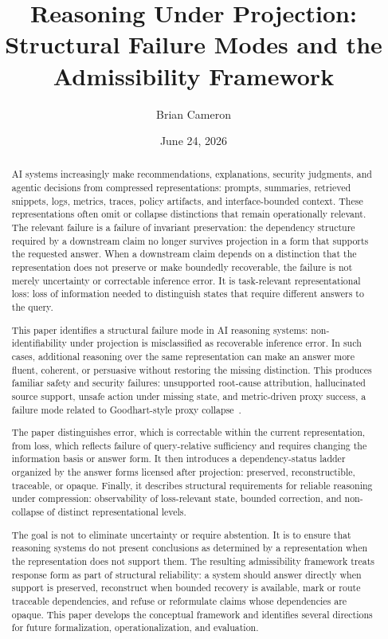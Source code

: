 \documentclass[11pt]{article}
\title{Reasoning Under Projection:\\
Structural Failure Modes and the Admissibility Framework}
\author{Brian Cameron}
\date{June 24, 2026}
\begin{document}
\maketitle

\begin{abstract}
AI systems increasingly make recommendations, explanations, security judgments, and agentic decisions from compressed representations: prompts, summaries, retrieved snippets, logs, metrics, traces, policy artifacts, and interface-bounded context. These representations often omit or collapse distinctions that remain operationally relevant. The relevant failure is a failure of invariant preservation: the dependency structure required by a downstream claim no longer survives projection in a form that supports the requested answer. When a downstream claim depends on a distinction that the representation does not preserve or make boundedly recoverable, the failure is not merely uncertainty or correctable inference error. It is task-relevant representational loss: loss of information needed to distinguish states that require different answers to the query.

This paper identifies a structural failure mode in AI reasoning systems: non-identifiability under projection is misclassified as recoverable inference error. In such cases, additional reasoning over the same representation can make an answer more fluent, coherent, or persuasive without restoring the missing distinction. This produces familiar safety and security failures: unsupported root-cause attribution, hallucinated source support, unsafe action under missing state, and metric-driven proxy success, a failure mode related to Goodhart-style proxy collapse~\cite{Goodhart1975}.

The paper distinguishes error, which is correctable within the current representation, from loss, which reflects failure of query-relative sufficiency and requires changing the information basis or answer form. It then introduces a dependency-status ladder organized by the answer forms licensed after projection: preserved, reconstructible, traceable, or opaque. Finally, it describes structural requirements for reliable reasoning under compression: observability of loss-relevant state, bounded correction, and non-collapse of distinct representational levels.

The goal is not to eliminate uncertainty or require abstention. It is to ensure that reasoning systems do not present conclusions as determined by a representation when the representation does not support them. The resulting admissibility framework treats response form as part of structural reliability: a system should answer directly when support is preserved, reconstruct when bounded recovery is available, mark or route traceable dependencies, and refuse or reformulate claims whose dependencies are opaque. This paper develops the conceptual framework and identifies several directions for future formalization, operationalization, and evaluation.
\end{abstract}
\end{document}
